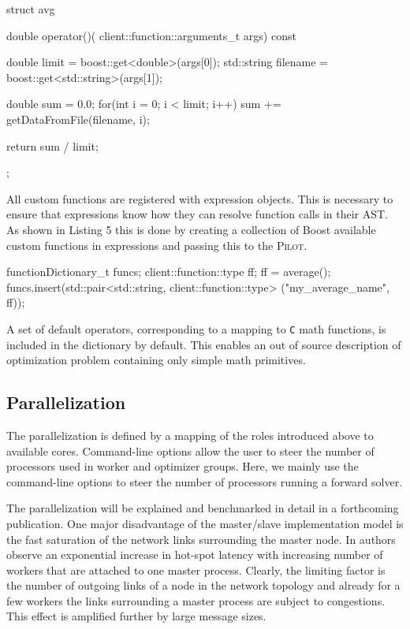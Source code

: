\documentclass[%
reprint,
amsmath,amssymb,
aps,
prstab,
]{revtex4-1}
\begin{document}
\begin{code}
struct avg {

    double operator()(
      client::function::arguments_t args) const {

        double limit = boost::get<double>(args[0]);
        std::string filename =
          boost::get<std::string>(args[1]);

        double sum = 0.0;
        for(int i = 0; i < limit; i++)
            sum += getDataFromFile(filename, i);

        return sum / limit;
    }
};
\end{code}

All custom functions are registered with expression objects.
This is necessary to ensure that expressions know how they can resolve
  function calls in their AST.
As shown in Listing 5 this is done by creating a collection of Boost
  available custom functions in expressions and passing this to the
  \textsc{Pilot}.

\begin{code}
functionDictionary_t funcs;
client::function::type ff;
ff = average();
funcs.insert(std::pair<std::string, 
		client::function::type> 
       		("my_average_name", ff));
\end{code}

A set of default operators, corresponding to a mapping to \texttt{C} math
  functions, is included in the dictionary by default.
This enables an out of source description of optimization problem containing
  only simple math primitives.


\subsection{Parallelization} \label{sec:parallelization}

The parallelization is defined by a mapping of the roles introduced above to
  available cores.
Command-line options allow the user to steer the number of processors used in
  worker and optimizer groups.
Here, we mainly use the command-line options to steer the number of processors
  running a forward solver.

The parallelization will be explained and benchmarked in detail in a
  forthcoming publication.
One major disadvantage of the master/slave implementation model is the fast
  saturation of the network links surrounding the master node.
In \cite{bctg:09} authors observe an exponential increase in hot-spot latency
  with increasing number of workers that are attached to one master process.
Clearly, the limiting factor is the number of outgoing links of a node in the
  network topology and already for a few workers the links surrounding a
  master process are subject to congestions.
This effect is amplified further by large message sizes.
\end{document}
